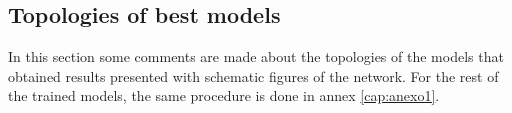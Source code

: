         \begin{figure}[H]
        \end{figure}
        
    \subsection{Topologies of best models}
    
    In this section some comments are made about the topologies of the models that obtained results presented with schematic figures of the network. For the rest of the trained models, the same procedure is done in annex \ref{cap:anexo1}.
         
